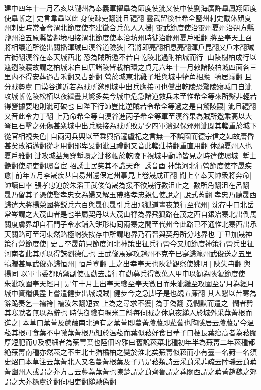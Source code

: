 建中四年十一月乙亥以隴州為奉義軍擢臯為節度使泚又使中使劉海廣許臯鳳翔節度使臯斬之|{
	史言韋臯以此身使疎吏翻泚且禮翻}
靈武留後杜希全鹽州刺史戴休顔夏州刺史時常春會渭北節度使李建徽合兵萬人入援|{
	靈武節度使治靈州夏州治朔方縣鹽州治五原縣皆鄰境相接渭北節度使本治坊州時徙治鄜州夏戶雅翻}
將至奉天上召將相議道所從出關播渾瑊曰漠谷道險狹|{
	召將即亮翻相息亮翻渾戶昆翻又戶本翻瑊古衘翻漠谷在奉天城西北}
恐為賊所邀不若自乾陵北過附柏城而行|{
	山陵樹柏成行以遮迾陵寢故謂之柏城宋白曰唐諸陵皆栽柏環之貞元六年十一月敕諸陵柏城四面各三里内不得安葬過古禾翻又古卧翻}
營於城東北雞子堆與城中犄角相應|{
	犄居蟻翻}
且分賊勢盧曰漠谷道近若為賊所邀則城中出兵應接可也儻出乾陵恐驚陵寢瑊曰自泚攻城斬乾陵松栢以夜繼晝其驚多矣今城中危急諸道救兵未至惟希全等來所繫非輕若得營據要地則泚可破也曰陛下行師豈比逆賊若令希全等過之是自驚陵寢|{
	泚且禮翻又音此令力丁翻}
上乃命希全等自漠谷進丙子希全等軍至漠谷果為賊所邀乘高以大弩巨石擊之死傷甚衆城中出兵應接為賊所敗是夕四軍潰退保邠州泚閲其輜重於城下從官相視失色|{
	自兩河兵興以至乘輿播遷盧杞之言無一不誤國而德宗信之如故庸昏甚矣敗補邁翻從才用翻邠卑旻翻泚且禮翻又音此輜莊持翻重直用翻}
休顔夏州人也|{
	夏戶雅翻}
泚攻城益急穿塹環之泚移帳於乾陵下視城中動静皆見之時遣使環城|{
	塹士艶翻使疏吏翻環音宦}
招誘士民笑其不識天命|{
	誘音酉}
神策河北行營節度使李晟疾愈|{
	前年五月李晟疾甚自易州還保定州事見上卷晟成正翻}
聞上幸奉天帥衆將奔命|{
	帥讀曰率}
張孝忠迫於朱滔王武俊倚晟為援不欲晟行數沮止之|{
	數所角翻沮在呂翻}
晟乃留其子憑使娶孝忠女為婦又解玉帶賂孝忠親信使說之|{
	說式芮翻}
孝忠乃聽晟西歸遣大將楊榮國將鋭兵六百與晟俱晟引兵出飛狐道晝夜兼行至代州|{
	沈存中曰北岳常岑謂之大茂山者是也半屬契丹以大茂山脊為界飛狐路在茂之西自銀冶寨北出倒馬關度虜界却自石門子令水鋪入缾形梅囘兩寨之間至代州今此路已不通惟北寨西出承天關路可至河東然路極峭狹按存中所謂地界乃石晉與契丹所分地界也}
丁丑加晟神策行營節度使|{
	史言李晟前只節度河北神策出征兵行營今又加節度神策行營兵出征河南者此其所以得誅劉德信也}
王武俊馬寔攻趙州不克辛巳寔歸瀛州武俊送之五里犒贈甚厚武俊亦歸恒州|{
	恒戶登翻}
上之出幸奉天也陜虢觀察使姚明|{
	陜失冉翻與揚同}
以軍事委都防禦副使張勸去詣行在勸募兵得數萬人甲申以勸為陜虢節度使　朱泚攻圍奉天經月|{
	是年十月上出奉天纔至奉天數日而朱泚繼至攻圍至是月為經月}
城中資糧俱盡上嘗遣健步出城覘賊|{
	健步今之急脚子是也覘五亷翻}
其人懇以苦寒為辭跪奏乞一襦袴|{
	襦汝朱翻短衣}
上為之尋求不獲|{
	為于偽翻}
竟憫默而遣之|{
	憫者矜其寒默者無以為辭也}
時供御纔有糲米二斛每伺賊之休息夜縋人於城外采蕪菁根而進之|{
	本草曰蕪菁及蘆菔南北通有之蕪菁即蔓菁蘆菔即蘿蔔也陶隱居云蘆菔是今温菘其根可食葉不中噉蕪菁根乃細於温菘而葉似菘好食日華子曰梗長葉瘦高者為菘闊厚短肥而及梗細者為蕪菁葉也陸佃埤雅曰舊說菘菜北種初年半為蕪菁二年菘種都絶蕪菁南種亦然菘之不生北土猶橘柚之變於淮北矣蕪菁似菘而小有臺一名葑一名須史炤曰本草注云蕪菁北人又名蔓菁根葉及子乃是菘類詩云采葑采菲疏云陸璣云葑蕪菁幽州人或謂之芥方言云蘴蕘蕪菁也陳楚謂之葑齊魯謂之蕘關西謂之蕪菁趙魏之郊謂之大芥糲盧達翻伺相吏翻縋馳偽翻}
